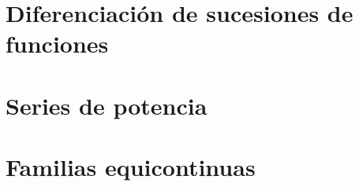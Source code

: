 \section{Diferenciación de sucesiones de funciones}

\section{Series de potencia}

\section{Familias equicontinuas}
